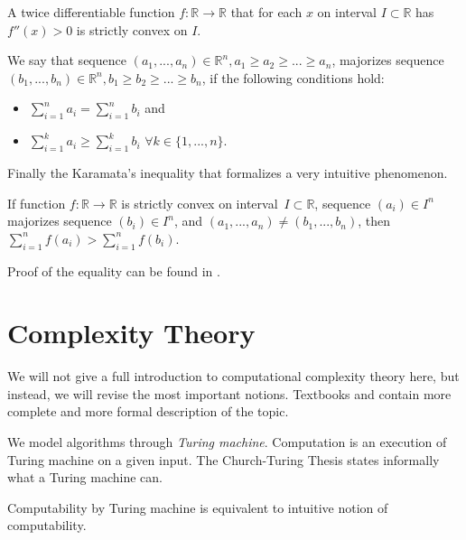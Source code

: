 \begin{prp}
A twice differentiable function $f:\mathbb{R}\rightarrow\mathbb{R}$
that for each $x$ on interval $I \subset \mathbb{R}$ has $f''(x) > 0$
is strictly convex on $I$.
\end{prp}

\begin{defn}[majorization]
We say that sequence $(a_1, ..., a_n) \in \mathbb{R}^n, a_1 \geq a_2 \geq ... \geq a_n$,
majorizes sequence $(b_1, ..., b_n) \in \mathbb{R}^n, b_1 \geq b_2 \geq ... \geq b_n$,
if the following conditions hold:
\begin{itemize}
	\item $\sum_{i=1}^n a_i = \sum_{i=1}^n b_i$ and
	\item $\sum_{i=1}^k a_i \geq \sum_{i=1}^k b_i$ $\forall k \in \{ 1, ..., n\}$.
\end{itemize}
\end{defn}

Finally the Karamata's inequality that formalizes a very intuitive phenomenon.

\begin{thm} \label{thm:Kar}
If function $f:\mathbb{R}\rightarrow\mathbb{R}$ is strictly convex on interval~$I \subset \mathbb{R}$,
sequence $(a_i) \in I^n$ majorizes sequence $(b_i) \in I^n$,
and $(a_1, ..., a_n) \neq (b_1, ..., b_n)$, then
$\sum_{i=1}^n f(a_i) > \sum_{i=1}^n f(b_i)$.
\end{thm}

Proof of the equality can be found in \cite{karamata}.

\section{Complexity Theory}

We will not give a full introduction to computational complexity theory here,
but instead, we will revise the most important notions.
Textbooks \cite{compcomplexity} and \cite{computersandintractability}
contain more complete and more formal description of the topic. %

We model algorithms through \textit{Turing machine}.
Computation is an execution of Turing machine on a given input.
The Church-Turing Thesis states informally what a Turing machine can.

\begin{cnj}
Computability by Turing machine is equivalent to intuitive notion of computability.
\end{cnj}

